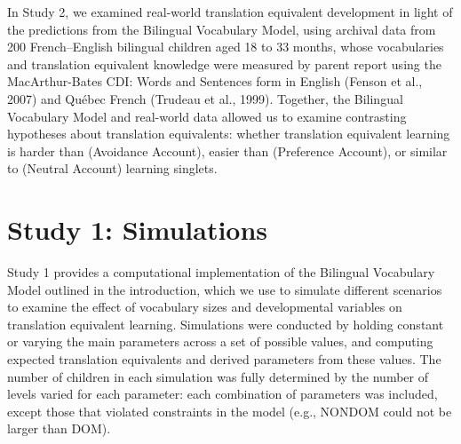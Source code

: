 \documentclass[
  english,
  ,man,floatsintext]{apa6}
\begin{document}
In Study 2, we examined real-world translation equivalent development in light of the predictions from the Bilingual Vocabulary Model, using archival data from 200 French--English bilingual children aged 18 to 33 months, whose vocabularies and translation equivalent knowledge were measured by parent report using the MacArthur-Bates CDI: Words and Sentences form in English (Fenson et al., 2007) and Québec French (Trudeau et al., 1999). Together, the Bilingual Vocabulary Model and real-world data allowed us to examine contrasting hypotheses about translation equivalents: whether translation equivalent learning is harder than (Avoidance Account), easier than (Preference Account), or similar to (Neutral Account) learning singlets.

\hypertarget{study-1-simulations}{%
\section{Study 1: Simulations}\label{study-1-simulations}}

Study 1 provides a computational implementation of the Bilingual Vocabulary Model outlined in the introduction, which we use to simulate different scenarios to examine the effect of vocabulary sizes and developmental variables on translation equivalent learning. Simulations were conducted by holding constant or varying the main parameters across a set of possible values, and computing expected translation equivalents and derived parameters from these values. The number of children in each simulation was fully determined by the number of levels varied for each parameter: each combination of parameters was included, except those that violated constraints in the model (e.g., NONDOM could not be larger than DOM).
\end{document}

